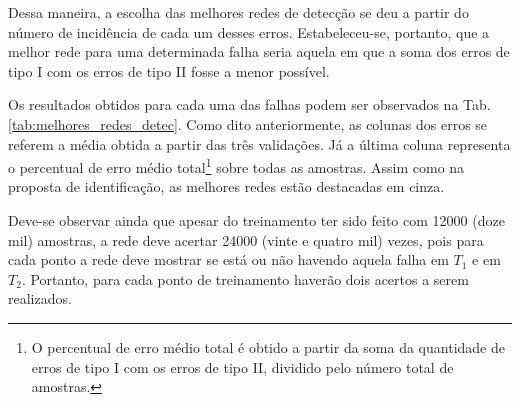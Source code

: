 Dessa maneira, a escolha das melhores redes de detecção se deu a partir do
número de incidência de cada um desses erros. Estabeleceu-se, portanto, que a
melhor rede para uma determinada falha seria aquela em que a soma dos erros de
tipo I com os erros de tipo II fosse a menor possível.

Os resultados obtidos para cada uma das falhas podem ser observados na Tab.
\ref{tab:melhores_redes_detec}. Como dito anteriormente, as colunas dos erros se
referem a média obtida a partir das três validações. Já a última coluna
representa o percentual de erro médio total\footnote{O percentual de erro médio
total é obtido a partir da soma da quantidade de erros de tipo I com os erros de
tipo II, dividido pelo número total de amostras.} sobre todas as amostras.
Assim como na proposta de identificação, as melhores redes estão destacadas em
cinza.

Deve-se observar ainda que apesar do treinamento ter sido feito com 12000 (doze
mil) amostras, a rede deve acertar 24000 (vinte e quatro mil) vezes, pois para
cada ponto a rede deve mostrar se está ou não havendo aquela falha em $T_1$ e em
$T_2$. Portanto, para cada ponto de treinamento haverão dois acertos a serem
realizados. 

